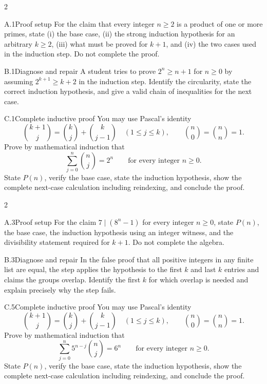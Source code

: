 \documentclass[9pt]{extarticle}
\begin{document}
\CoreWorkArea
\FormBreak
{}
\begin{multicols}{2}
\begin{CompactCoreProblem}{A.1}{Proof setup}
For the claim that every integer $n\ge2$ is a product of one or more primes, state (i) the base case, (ii) the strong induction hypothesis for an arbitrary $k\ge2$, (iii) what must be proved for $k+1$, and (iv) the two cases used in the induction step. Do not complete the proof.
\end{CompactCoreProblem}
\begin{CompactCoreProblem}{B.1}{Diagnose and repair}
A student tries to prove $2^n\ge n+1$ for $n\ge0$ by assuming $2^{k+1}\ge k+2$ in the induction step. Identify the circularity, state the correct induction hypothesis, and give a valid chain of inequalities for the next case.
\end{CompactCoreProblem}
\end{multicols}
\begin{CompactCoreProblem}{C.1}{Complete inductive proof}
You may use Pascal's identity
\[
\binom{k+1}{j}=\binom{k}{j}+\binom{k}{j-1}
\quad(1\le j\le k),\qquad
\binom{n}{0}=\binom{n}{n}=1.
\]
Prove by mathematical induction that
\[
\sum_{j=0}^{n}\binom{n}{j}=2^n\qquad\text{for every integer }n\ge0.
\]
State $P(n)$, verify the base case, state the induction hypothesis, show the complete next-case calculation including reindexing, and conclude the proof.
\end{CompactCoreProblem}
\CoreWorkArea
\FormBreak
{}
\begin{multicols}{2}
\begin{CompactCoreProblem}{A.3}{Proof setup}
For the claim $7\mid(8^n-1)$ for every integer $n\ge0$, state $P(n)$, the base case, the induction hypothesis using an integer witness, and the divisibility statement required for $k+1$. Do not complete the algebra.
\end{CompactCoreProblem}
\begin{CompactCoreProblem}{B.3}{Diagnose and repair}
In the false proof that all positive integers in any finite list are equal, the step applies the hypothesis to the first $k$ and last $k$ entries and claims the groups overlap. Identify the first $k$ for which overlap is needed and explain precisely why the step fails.
\end{CompactCoreProblem}
\end{multicols}
\begin{CompactCoreProblem}{C.5}{Complete inductive proof}
You may use Pascal's identity
\[
\binom{k+1}{j}=\binom{k}{j}+\binom{k}{j-1}
\quad(1\le j\le k),\qquad
\binom{n}{0}=\binom{n}{n}=1.
\]
Prove by mathematical induction that
\[
\sum_{j=0}^{n} 5^{n-j}\binom{n}{j}=6^n\qquad\text{for every integer }n\ge0.
\]
State $P(n)$, verify the base case, state the induction hypothesis, show the complete next-case calculation including reindexing, and conclude the proof.
\end{CompactCoreProblem}
\end{document}
